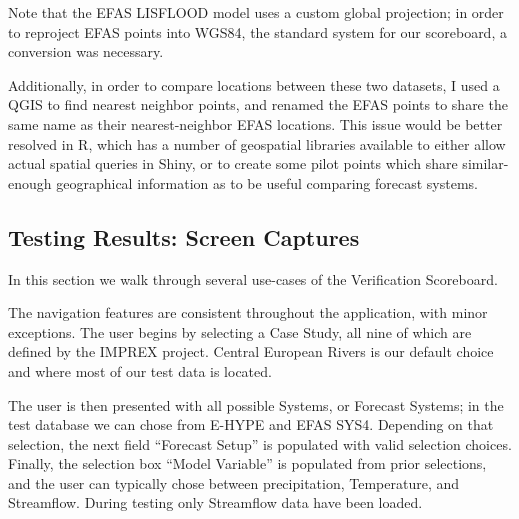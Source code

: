 \documentclass[logos,parttoc,morelanguage=french,morelanguage=german]{orsay-memoire}
\begin{document}
Note that the EFAS LISFLOOD model uses a custom global projection; in order to reproject EFAS points into WGS84, the standard system for our scoreboard, a conversion was necessary.

Additionally, in order to compare locations between these two datasets, I used a QGIS to find nearest neighbor points, and renamed the EFAS points to share the same name as their nearest-neighbor EFAS locations. This issue would be better resolved in R, which has a number of geospatial libraries available to either allow actual spatial queries in Shiny, or to create some pilot points which share similar-enough geographical information as to be useful comparing forecast systems.


%
%

\subsection{Testing Results: Screen Captures}

In this section we walk through several use-cases of the Verification Scoreboard.

The navigation features are consistent throughout the application, with minor exceptions. The user begins by selecting a Case Study, all nine of which are defined by the IMPREX project. Central European Rivers is our default choice and where most of our test data is located.

The user is then presented with all possible Systems, or Forecast Systems; in the test database we can chose from E-HYPE and EFAS SYS4. Depending on that selection, the next field ``Forecast Setup'' is populated with valid selection choices. Finally, the selection box ``Model Variable'' is populated from prior selections, and the user can typically chose between precipitation, Temperature, and Streamflow. During testing only Streamflow data have been loaded.
\end{document}
